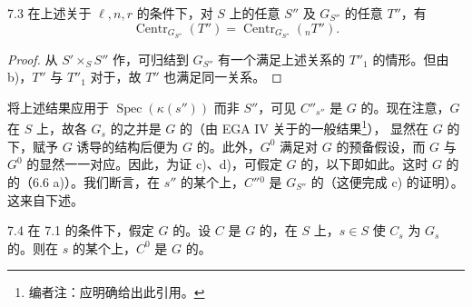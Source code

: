\begin{SGAresult}{}{7.3}
在上述关于 $\ell,n,r$ 的条件下，对 $S$ 上的任意 $S''$ 及 $G_{S''}$ 的任意 $T''$，有
\[
\operatorname{Centr}_{G_{S''}}(T'')=\operatorname{Centr}_{G_{S''}}({}_nT'').
\]
\end{SGAresult}
\begin{proof}
从 $S'\times_SS''$ 作，可归结到 $G_{S''}$ 有一个满足上述关系的 $T''_1$ 的情形。但由 b)，$T''$ 与 $T''_1$ 对于，故 $T''$ 也满足同一关系。
\end{proof}
将上述结果应用于 $\operatorname{Spec}(\kappa(s''))$ 而非 $S''$，可见 $C''_{s''}$ 是 $G$ 的。现在注意，$G$ 在 $S$ 上，故各 $G_s$ 的之并是 $G$ 的（由 EGA IV 关于的一般结果\footnote{编者注：应明确给出此引用。}），
显然在 $G$ 的下，赋予 $G$ 诱导的结构后便为 $G$ 的。此外，$G^0$ 满足对 $G$ 的预备假设，而 $G$ 与 $G^0$ 的显然一一对应。因此，为证 c)、d)，可假定 $G$ 的，以下即如此。这时 $G$ 的的（6.6 a)）。我们断言，在 $s''$ 的某个上，$C''{}^0$ 是 $G_{S''}$ 的（这便完成 c) 的证明）。这来自下述。
\begin{SGAresult}{}{7.4}
在 7.1 的条件下，假定 $G$ 的。设 $C$ 是 $G$ 的，在 $S$ 上，$s\in S$ 使 $C_s$ 为 $G_s$ 的。则在 $s$ 的某个上，$C^0$ 是 $G$ 的。
\end{SGAresult}
